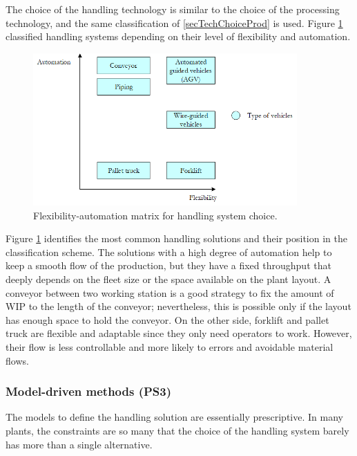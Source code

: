 The choice of the handling technology is similar to the choice of the processing technology, and the same classification of \ref{secTechChoiceProd} is used. Figure \ref{fig_prod_handling_system} classified handling systems depending on their level of flexibility and automation.

\begin{figure}[hbt!]
\centering
\includegraphics[width=0.9\textwidth]{sectionProduction/design_process_figures/fig_prod_handling_system.png}
\captionsetup{type=figure}
\caption{Flexibility-automation matrix for handling system choice.}
\label{fig_prod_handling_system}
\end{figure}

Figure \ref{fig_prod_handling_system} identifies the most common handling solutions and their position in the classification scheme. The solutions with a high degree of automation help to keep a smooth flow of the production, but they have a fixed throughput that deeply depends on the fleet size or the space available on the plant layout. A conveyor between two working station is a good strategy to fix the amount of WIP to the length of the conveyor; nevertheless, this is possible only if the layout has enough space to hold the conveyor. On the other side, forklift and pallet truck are flexible and adaptable since they only need operators to work. However, their flow is less controllable and more likely to errors and avoidable material flows.

\subsubsection{Model-driven methods (PS3)}
The models to define the handling solution are essentially prescriptive. In many plants, the constraints are so many that the choice of the handling system barely has more than a single alternative.\par


